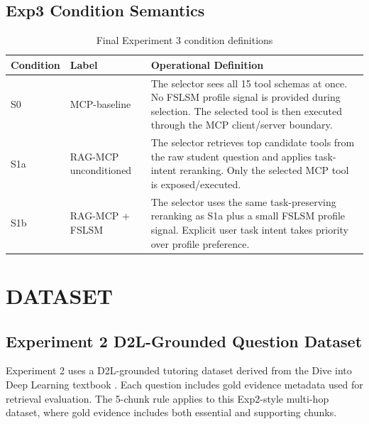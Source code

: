\section{Exp3 Condition Semantics}
\begin{table}[h]
    \centering
    \begin{tabular}{|p{2cm}|p{4.2cm}|p{8cm}|}
        \hline
        \textbf{Condition} & \textbf{Label} & \textbf{Operational Definition} \\
        \hline
        S0 & MCP-baseline & The selector sees all 15 tool schemas at once. No FSLSM profile signal is provided during selection. The selected tool is then executed through the MCP client/server boundary. \\
        \hline
        S1a & RAG-MCP unconditioned & The selector retrieves top candidate tools from the raw student question and applies task-intent reranking. Only the selected MCP tool is exposed/executed. \\
        \hline
        S1b & RAG-MCP + FSLSM & The selector uses the same task-preserving reranking as S1a plus a small FSLSM profile signal. Explicit user task intent takes priority over profile preference. \\
        \hline
    \end{tabular}
    \caption{Final Experiment 3 condition definitions}
    \label{tab:exp3-conditions}
\end{table}

\chapter{\uppercase{Dataset}}
\section{Experiment 2 D2L-Grounded Question Dataset}
Experiment 2 uses a D2L-grounded tutoring dataset derived from the Dive into Deep Learning textbook \citep{zhang2021dive}. Each question includes gold evidence metadata used for retrieval evaluation. The 5-chunk rule applies to this Exp2-style multi-hop dataset, where gold evidence includes both essential and supporting chunks.

